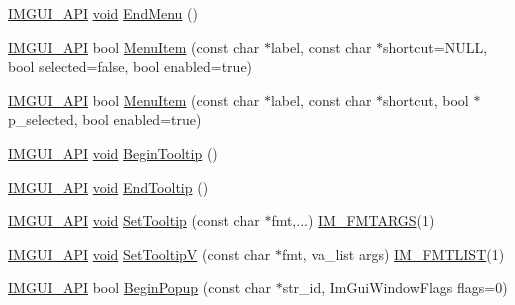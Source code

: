 \begin{DoxyCompactItemize}
\item 
\hyperlink{imgui_8h_a43829975e84e45d1149597467a14bbf5}{I\+M\+G\+U\+I\+\_\+\+A\+PI} \hyperlink{imgui__impl__opengl3__loader_8h_ac668e7cffd9e2e9cfee428b9b2f34fa7}{void} \hyperlink{namespaceImGui_a1448a5a4e8c431c15f991e9255c0df95}{End\+Menu} ()
\item 
\hyperlink{imgui_8h_a43829975e84e45d1149597467a14bbf5}{I\+M\+G\+U\+I\+\_\+\+A\+PI} bool \hyperlink{namespaceImGui_aa1bae511ca47478998693a9d8c84f2e6}{Menu\+Item} (const char $\ast$label, const char $\ast$shortcut=N\+U\+LL, bool selected=false, bool enabled=true)
\item 
\hyperlink{imgui_8h_a43829975e84e45d1149597467a14bbf5}{I\+M\+G\+U\+I\+\_\+\+A\+PI} bool \hyperlink{namespaceImGui_a237e76bff3088f1c2622f4aebae2356e}{Menu\+Item} (const char $\ast$label, const char $\ast$shortcut, bool $\ast$p\+\_\+selected, bool enabled=true)
\item 
\hyperlink{imgui_8h_a43829975e84e45d1149597467a14bbf5}{I\+M\+G\+U\+I\+\_\+\+A\+PI} \hyperlink{imgui__impl__opengl3__loader_8h_ac668e7cffd9e2e9cfee428b9b2f34fa7}{void} \hyperlink{namespaceImGui_a36816a48385f4759d746a03cf6202512}{Begin\+Tooltip} ()
\item 
\hyperlink{imgui_8h_a43829975e84e45d1149597467a14bbf5}{I\+M\+G\+U\+I\+\_\+\+A\+PI} \hyperlink{imgui__impl__opengl3__loader_8h_ac668e7cffd9e2e9cfee428b9b2f34fa7}{void} \hyperlink{namespaceImGui_ac8d75c160cfdf43d512f773ca133a1c6}{End\+Tooltip} ()
\item 
\hyperlink{imgui_8h_a43829975e84e45d1149597467a14bbf5}{I\+M\+G\+U\+I\+\_\+\+A\+PI} \hyperlink{imgui__impl__opengl3__loader_8h_ac668e7cffd9e2e9cfee428b9b2f34fa7}{void} \hyperlink{namespaceImGui_a313073fa01b8a9791f241ef93091ce92}{Set\+Tooltip} (const char $\ast$fmt,...) \hyperlink{imgui_8h_a1251c2f9ddac0873dbad8181bd82c9f1}{I\+M\+\_\+\+F\+M\+T\+A\+R\+GS}(1)
\item 
\hyperlink{imgui_8h_a43829975e84e45d1149597467a14bbf5}{I\+M\+G\+U\+I\+\_\+\+A\+PI} \hyperlink{imgui__impl__opengl3__loader_8h_ac668e7cffd9e2e9cfee428b9b2f34fa7}{void} \hyperlink{namespaceImGui_a3826acf68fc4a12bb66401575f51d6a2}{Set\+TooltipV} (const char $\ast$fmt, va\+\_\+list args) \hyperlink{imgui_8h_a047693beb7f899f5deab1e20202016b3}{I\+M\+\_\+\+F\+M\+T\+L\+I\+ST}(1)
\item 
\hyperlink{imgui_8h_a43829975e84e45d1149597467a14bbf5}{I\+M\+G\+U\+I\+\_\+\+A\+PI} bool \hyperlink{namespaceImGui_a10e213926d8ca212266bc5fbded1e026}{Begin\+Popup} (const char $\ast$str\+\_\+id, Im\+Gui\+Window\+Flags flags=0)
\item 

\end{DoxyCompactItemize}
